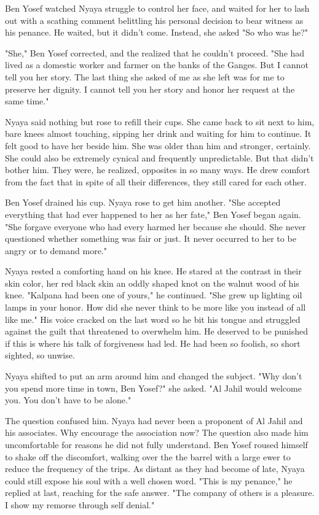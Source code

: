 \documentclass{amsart}
\begin{document}
Ben Yosef watched Nyaya struggle to control her face, and waited for her to lash out with a scathing comment belittling his personal decision to bear witness as his penance. He waited, but it didn't come. Instead, she asked "So who was he?"

"She," Ben Yosef corrected, and the realized that he couldn't proceed. "She had lived as a domestic worker and farmer on the banks of the Ganges. But I cannot tell you her story. The last thing she asked of me as she left was for me to preserve her dignity. I cannot tell you her story and honor her request at the same time." 

Nyaya said nothing but rose to refill their cups. She came back to sit next to him, bare knees almost touching, sipping her drink and waiting for him to continue. It felt good to have her beside him. She was older than him and stronger, certainly. She could also be extremely cynical and frequently unpredictable. But that didn't bother him. They were, he realized, opposites in so many ways. He drew comfort from the fact that in spite of all their differences, they still cared for each other. 

Ben Yosef drained his cup. Nyaya rose to get him another. "She accepted everything that had ever happened to her as her fate," Ben Yosef began again. "She forgave everyone who had every harmed her because she should. She never questioned whether something was fair or just. It never occurred to her to be angry or to demand more."

Nyaya rested a comforting hand on his knee. He stared at the contrast in their skin color, her red black skin an oddly shaped knot on the walnut wood of his knee. "Kalpana had been one of yours," he continued. "She grew up lighting oil lamps in your honor. How did she never think to be more like you instead of all like me." His voice cracked on the last word so he bit his tongue and struggled against the guilt that threatened to overwhelm him. He deserved to be punished if this is where his talk of forgiveness had led. He had been so foolish, so short sighted, so unwise. 

Nyaya shifted to put an arm around him and changed the subject. "Why don't you spend more time in town, Ben Yosef?" she asked. "Al Jahil would welcome you. You don't have to be alone."

The question confused him. Nyaya had never been a proponent of Al Jahil and his associates. Why encourage the association now? The question also made him uncomfortable for reasons he did not fully understand. Ben Yosef roused himself to shake off the discomfort, walking over the the barrel with a large ewer to reduce the frequency of the trips. As distant as they had become of late, Nyaya could still expose his soul with a well chosen word. "This is my penance," he replied at last, reaching for the safe answer. "The company of others is a pleasure. I show my remorse through self denial." 
\end{document}
